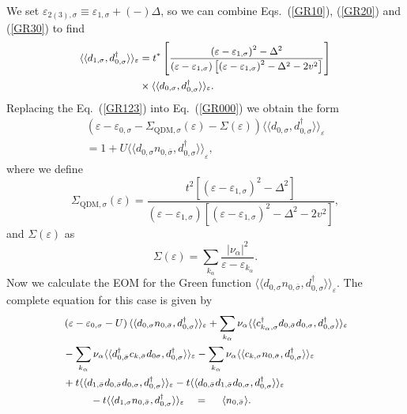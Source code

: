 \documentclass[aps,twocolumn,prb,superscript,floatfix,superscriptaddress,showpacs]{revtex4-1}
\newcommand{\ve}{\varepsilon}
\newcommand{\la}{\langle}
\newcommand{\ra}{\rangle}
\begin{document}
We set $\ve_{2(3),\sigma}\equiv\ve_{1,\sigma}+ (-) \Delta$, so we can combine Eqs.\ (\ref{GR10}), (\ref{GR20}) and (\ref{GR30}) to find
\begin{equation}
\small
\begin{aligned}
\la\la d_{1,\sigma}, d_{0,\sigma}^{\dagger}\ra\ra_{\ve} &=t^{*}\left[\frac{\left(\ve-\ve_{1,\sigma}\right)^{2}-\Delta^{2}}{\left(\ve-\ve_{1,\sigma}\right)\left[\left(\ve-\ve_{1,\sigma}\right)^{2}-\Delta^{2}-2v^{2}\right]}\right] \\ & \times \la\la d_{0,\sigma},d_{0,\sigma}^{\dagger}\ra\ra_{\ve}.
\end{aligned}\label{GR123}
\end{equation}
Replacing the Eq.\ (\ref{GR123}) into Eq.\ (\ref{GR000}) we obtain the form
\begin{eqnarray}
\nonumber
\left(\ve-\ve_{0,\sigma}-\Sigma_{\text{QDM},\sigma}\left(\ve\right)-\Sigma\left(\ve\right)\right)\la\la d_{0,\sigma}, d_{0,\sigma}^{\dagger}\ra\ra_{\ve} \\= 1+ U {\la\la d_{0,\sigma} n_{0,\bar{\sigma}},d_{0,\sigma}^{\dagger} \ra\ra}_{\ve},
\label{A9}
\end{eqnarray}
where we define
\begin{equation}
\Sigma_{\text{QDM},\sigma}\left(\ve\right)=\frac{t^{2}\left[\left(\ve-\ve_{1,\sigma}\right)^{2}-\Delta^{2}\right]}{\left(\ve-\ve_{1,\sigma}\right)\left[\left(\ve-\ve_{1,\sigma}\right)^{2}-\Delta^{2}-2v^{2}\right]},
\end{equation}
and $\Sigma(\ve)$ as
\begin{equation}
\Sigma\left(\ve\right)=\sum_{k_{\alpha}}\frac{|\nu_{\alpha}|^{2}}{\ve-\ve_{k_{\alpha}}}.
\end{equation}
Now we calculate the EOM for the Green function $\la\la d_{0,\sigma}n_{0,\bar{\sigma}},d_{0,\sigma}^{\dagger}\ra\ra_{\ve}$. The complete equation for this case is given by
\begin{equation}
\small
\begin{aligned}
&\left(\ve-\ve_{0,\sigma}-U\right)\la\la d_{0,\sigma}n_{0,\bar{\sigma}},d_{0,\sigma}^{\dagger}\ra\ra_{\ve}+\sum_{k_{\alpha}}\nu_{\alpha}\la\la c_{k_{\alpha},\sigma}^{\dagger}d_{0,\bar{\sigma}}d_{0,\sigma}, d_{0,\sigma}^{\dagger}\ra\ra_{\ve} \\ &- \sum_{k_{\alpha}}\nu_{\alpha
}\la\la d_{0,\bar{\sigma}}^{\dagger}c_{k,\bar{\sigma}}d_{0\sigma}, d_{0, \sigma}^{\dagger}\ra\ra_{\ve}- \sum_{k_{\alpha}}\nu_{\alpha
}\la\la c_{k,\sigma}n_{0,\bar{\sigma}}, d_{0, \sigma}^{\dagger}\ra\ra_{\ve} \\ &+ t\la\la d_{1,\bar{\sigma}}d_{0,\bar{\sigma}}d_{0,\sigma},d_{0,\sigma}^{\dagger}\ra\ra_{\ve} -t\la\la d_{0,\bar{\sigma}}d_{1,\bar{\sigma}}d_{0,\sigma},d_{0,\sigma}^{\dagger}\ra\ra_{\ve} \\ & \  \ \ \  \ \ \ \  -t\la\la d_{1,\sigma}n_{0,\bar{\sigma}},d_{0,\sigma}^{\dagger} \ra\ra_{\ve} \ \ \ = \ \ \ \ \langle n_{0,\bar{\sigma}}\rangle.
\end{aligned}\label{EOM0}
\end{equation}
\end{document}
